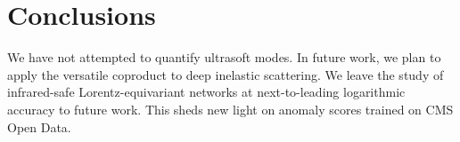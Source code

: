 \section{Conclusions}\label{sec:conclusions}

We have not attempted to quantify ultrasoft modes. In future work, we
plan to apply the versatile coproduct to deep inelastic scattering. We
leave the study of infrared-safe Lorentz-equivariant networks at
next-to-leading logarithmic accuracy to future work. This sheds new
light on anomaly scores trained on CMS Open Data.

